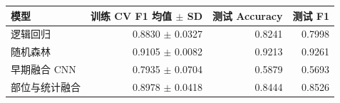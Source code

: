 \begin{tabular}{lrrr}
\toprule
模型 & 训练 CV F1 均值 $\pm$ SD & 测试 Accuracy & 测试 F1 \\
\midrule
逻辑回归 & 0.8830 $\pm$ 0.0327 & 0.8241 & 0.7998 \\
随机森林 & 0.9105 $\pm$ 0.0082 & 0.9213 & 0.9261 \\
早期融合 CNN & 0.7935 $\pm$ 0.0704 & 0.5879 & 0.5693 \\
部位与统计融合 & 0.8978 $\pm$ 0.0418 & 0.8444 & 0.8526 \\
\bottomrule
\end{tabular}
